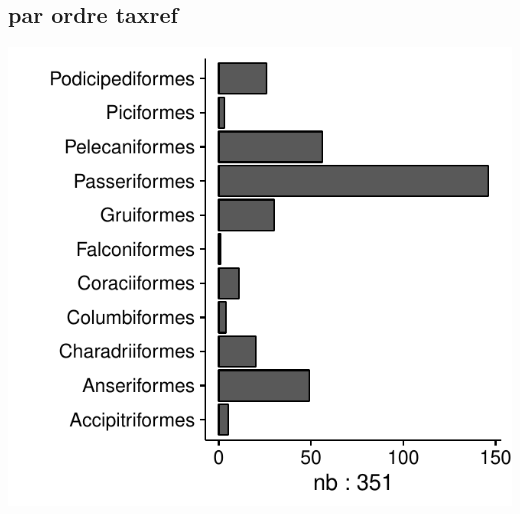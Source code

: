 \subsection*{par ordre taxref}
\includegraphics[width=\malargeurgraphique]{images/faune_stat_champ_ORDRE.pdf}
